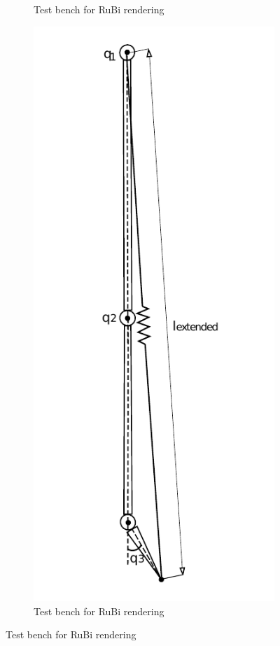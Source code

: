 \begin{figure}[ht!]
\begin{subfigure}[b]{0.25\textwidth}
        \caption{Test bench for RuBi rendering}
        \label{fig:virtual_spring2}
    \end{subfigure}
    \begin{subfigure}[b]{0.25\textwidth}
        \includegraphics[width=\textwidth]{figures//spring_model_max_extended.pdf}
        \caption{Test bench for RuBi rendering}
        \label{fig:virtual_spring3}
    \end{subfigure}
\end{figure}  

